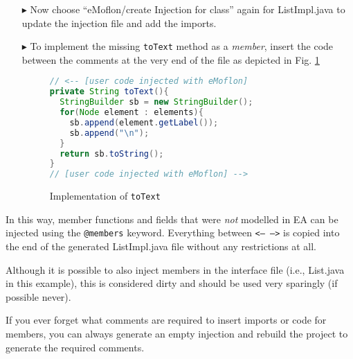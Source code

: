 \begin{enumerate}
  \item[$\blacktriangleright$] Now choose ``eMoflon/create Injection for class'' again for \textsf{ListImpl.java} to update the injection file and add the
  imports.

  \item[$\blacktriangleright$] To implement the missing \texttt{toText} method as a \emph{member}, insert the code between the comments at the very end of the
  file as depicted in Fig. \ref{code:toText_impl}

\begin{figure}[htbp]
\centering
  \begin{lstlisting}[language=Java, keywordstyle={\bfseries\color{purple}}, backgroundcolor=\color{white}]
// <-- [user code injected with eMoflon]
private String toText(){
  StringBuilder sb = new StringBuilder();
  for(Node element : elements){
    sb.append(element.getLabel());
    sb.append("\n");
  }
  return sb.toString();
}
// [user code injected with eMoflon] -->
  \end{lstlisting}
\caption{Implementation of \texttt{toText}}
\label{code:toText_impl}
\end{figure}

\end{enumerate}

In this way, member functions and fields that were \emph{not} modelled in EA can be injected using the \texttt{@members} keyword.
Everything between \texttt{<--  -->} is copied into the end of the generated \textsf{ListImpl.java} file without any restrictions at all.

Although it is possible to also inject members in the interface file (i.e., \textsf{List.java} in this example), this is considered dirty and should be used
very sparingly (if possible never).

 If you ever forget what comments are required to insert imports or code for members, you can
always generate an empty injection and rebuild the project to generate the required comments.

\clearpage